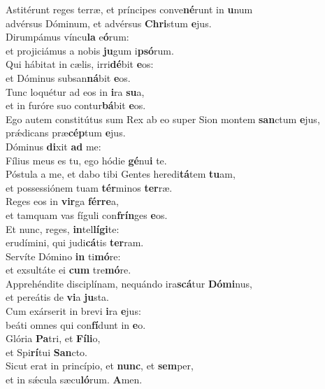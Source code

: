 \evenverse Astitérunt reges terræ, et príncipes conve\textbf{né}runt in \textbf{u}num~\*\\
\evenverse advérsus Dóminum, et advérsus \textbf{Chri}stum \textbf{e}jus.\\
\oddverse Dirumpámus víncu\textbf{la} e\textbf{ó}rum:~\*\\
\oddverse et projiciámus a nobis \textbf{ju}gum i\textbf{psó}rum.\\
\evenverse Qui hábitat in cælis, irri\textbf{dé}bit \textbf{e}os:~\*\\
\evenverse et Dóminus subsan\textbf{ná}bit \textbf{e}os.\\
\oddverse Tunc loquétur ad eos in \textbf{i}ra \textbf{su}a,~\*\\
\oddverse et in furóre suo contur\textbf{bá}bit \textbf{e}os.\\
\evenverse Ego autem constitútus sum Rex ab eo super Sion montem \textbf{san}ctum \textbf{e}jus,~\*\\
\evenverse prǽdicans præ\textbf{cép}tum \textbf{e}jus.\\
\oddverse Dóminus \textbf{di}xit \textbf{ad} me:~\*\\
\oddverse Fílius meus es tu, ego hódie \textbf{gé}nu\textbf{i} te.\\
\evenverse Póstula a me, et dabo tibi Gentes heredi\textbf{tá}tem \textbf{tu}am,~\*\\
\evenverse et possessiónem tuam \textbf{tér}minos \textbf{ter}ræ.\\
\oddverse Reges eos in \textbf{vir}ga \textbf{fér}\textbf{re}a,~\*\\
\oddverse et tamquam vas fíguli con\textbf{frín}ges \textbf{e}os.\\
\evenverse Et nunc, reges, \textbf{in}tel\textbf{lí}\textbf{gi}te:~\*\\
\evenverse erudímini, qui judi\textbf{cá}tis \textbf{ter}ram.\\
\oddverse Servíte Dómino \textbf{in} ti\textbf{mó}re:~\*\\
\oddverse et exsultáte ei \textbf{cum} tre\textbf{mó}re.\\
\evenverse Apprehéndite disciplínam, nequándo ira\textbf{scá}tur \textbf{Dó}\textbf{mi}nus,~\*\\
\evenverse et pereátis de \textbf{vi}a \textbf{ju}sta.\\
\oddverse Cum exárserit in brevi \textbf{i}ra \textbf{e}jus:~\*\\
\oddverse beáti omnes qui con\textbf{fí}dunt in \textbf{e}o.\\
\evenverse Glória \textbf{Pa}tri, et \textbf{Fí}\textbf{li}o,~\*\\
\evenverse et Spi\textbf{rí}tui \textbf{San}cto.\\
\oddverse Sicut erat in princípio, et \textbf{nunc}, et \textbf{sem}per,~\*\\
\oddverse et in sǽcula sæcu\textbf{ló}rum. \textbf{A}men.\\
